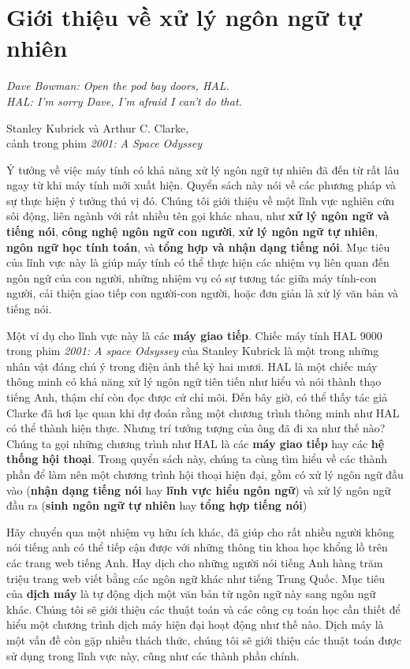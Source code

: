 \setcounter{chapter}{0}

\chapter{Giới thiệu về xử lý ngôn ngữ tự nhiên}

\setlength{}
\epigraphfontsize{\small}
\epigraph{
\itshape Dave Bowman: Open the pod bay doors, HAL.\\
HAL: I'm sorry Dave, I'm afraid I can't do that.\\
}{Stanley Kubrick và Arthur C. Clarke,\\
cảnh trong phim \textit{2001: A Space Odyssey}}

Ý tưởng về việc máy tính có khả năng xử lý ngôn ngữ tự nhiên đã đến từ rất lâu ngay từ khi máy tính mới xuất hiện. Quyển sách này nói về các phương pháp và sự thực hiện ý tưởng thú vị đó. Chúng tôi giới thiệu về một lĩnh vực nghiên cứu sôi động, liên ngành với rất nhiều tên gọi khác nhau, như \textbf{xử lý ngôn ngữ và tiếng nói}, \textbf{công nghệ ngôn ngữ con người}, \textbf{xử lý ngôn ngữ tự nhiên}, \textbf{ngôn ngữ học tính toán}, và \textbf{tổng hợp và nhận dạng tiếng nói}. Mục tiêu của lĩnh vực này là giúp máy tính có thể thực hiện các nhiệm vụ liên quan đến ngôn ngữ của con người, những nhiệm vụ có sự tương tác giữa máy tính-con người, cải thiện giao tiếp con người-con người, hoặc đơn giản là xử lý văn bản và tiếng nói.

Một ví dụ cho lĩnh vực này là các \textbf{máy giao tiếp}. Chiếc máy tính HAL 9000 trong phim \textit{2001: A space Odsyssey} của Stanley Kubrick là một trong những nhân vật đáng chú ý trong điện ảnh thế kỷ hai mươi. HAL là một chiếc máy thông minh có khả năng xử lý ngôn ngữ tiên tiến như hiểu và nói thành thạo tiếng Anh, thậm chí còn đọc được cử chỉ môi. Đến bây giờ, có thể thấy tác giả Clarke đã hơi lạc quan khi dự đoán rằng một chương trình thông minh như HAL có thể thành hiện thực. Nhưng trí tưởng tượng của ông đã đi xa như thế nào? Chúng ta gọi những chương trình như HAL là các \textbf{máy giao tiếp} hay các \textbf{hệ thống hội thoại}. Trong quyển sách này, chúng ta cùng tìm hiểu về các thành phần để làm nên một chương trình hội thoại hiện đại, gồm có xử lý ngôn ngữ đầu vào (\textbf{nhận dạng tiếng nói} hay \textbf{lĩnh vực hiểu ngôn ngữ}) và xử lý ngôn ngữ đầu ra (\textbf{sinh ngôn ngữ tự nhiên} hay \textbf{tổng hợp tiếng nói})

Hãy chuyển qua một nhiệm vụ hữu ích khác, đã giúp cho rất nhiều người không nói tiếng anh có thể tiếp cận được với những thông tin khoa học khổng lồ trên các trang web tiếng Anh. Hay dịch cho những người nói tiếng Anh hàng trăm triệu trang web viết bằng các ngôn ngữ khác như tiếng Trung Quốc. Mục tiêu của \textbf{dịch máy} là tự động dịch một văn bản từ ngôn ngữ này sang ngôn ngữ khác. Chúng tôi sẽ giới thiệu các thuật toán và các công cụ toán học cần thiết để hiểu một chương trình dịch máy hiện đại hoạt động như thế nào. Dịch máy là một vấn đề còn gặp nhiều thách thức, chúng tôi sẽ giới thiệu các thuật toán được sử dụng trong lĩnh vực này, cũng như các thành phần chính.

